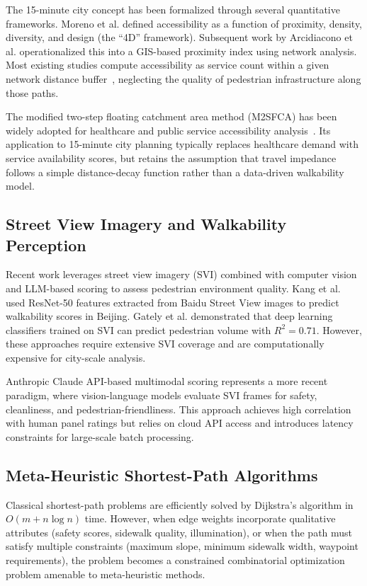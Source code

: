 \documentclass[journal]{IEEEtran}
\begin{document}
The 15-minute city concept has been formalized through several quantitative frameworks. Moreno et al. \cite{moreno2021fifteen} defined accessibility as a function of proximity, density, diversity, and design (the ``4D'' framework). Subsequent work by Arcidiacono et al. \cite{arcidiacono2022operationalizing} operationalized this into a GIS-based proximity index using network analysis. Most existing studies compute accessibility as service count within a given network distance buffer~\cite{marra2019measuring}, neglecting the quality of pedestrian infrastructure along those paths.

The modified two-step floating catchment area method (M2SFCA) has been widely adopted for healthcare and public service accessibility analysis~\cite{luo2009modified}. Its application to 15-minute city planning typically replaces healthcare demand with service availability scores, but retains the assumption that travel impedance follows a simple distance-decay function rather than a data-driven walkability model.

\subsection{Street View Imagery and Walkability Perception}

Recent work leverages street view imagery (SVI) combined with computer vision and LLM-based scoring to assess pedestrian environment quality. Kang et al. \cite{kang2023streetview} used ResNet-50 features extracted from Baidu Street View images to predict walkability scores in Beijing. Gately et al. \cite{gately2019urban} demonstrated that deep learning classifiers trained on SVI can predict pedestrian volume with $R^2 = 0.71$. However, these approaches require extensive SVI coverage and are computationally expensive for city-scale analysis.

Anthropic Claude API-based multimodal scoring represents a more recent paradigm, where vision-language models evaluate SVI frames for safety, cleanliness, and pedestrian-friendliness. This approach achieves high correlation with human panel ratings but relies on cloud API access and introduces latency constraints for large-scale batch processing.

\subsection{Meta-Heuristic Shortest-Path Algorithms}

Classical shortest-path problems are efficiently solved by Dijkstra's algorithm in $O(m + n \log n)$ time. However, when edge weights incorporate qualitative attributes (safety scores, sidewalk quality, illumination), or when the path must satisfy multiple constraints (maximum slope, minimum sidewalk width, waypoint requirements), the problem becomes a constrained combinatorial optimization problem amenable to meta-heuristic methods.
\end{document}
